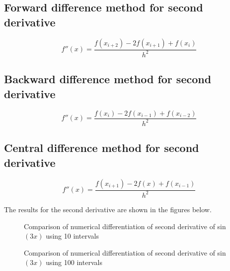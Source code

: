 \documentclass[12pt,a4paper,fleqn]{article}
\begin{document}
\subsection*{Forward difference method for second derivative}
\begin{equation}
f''(x) = \frac{f(x_{i+2})-2f(x_{i+1})+f(x_i)}{h^2}
\end{equation}

\subsection*{Backward difference method for second derivative}
\begin{equation}
f''(x) = \frac{f(x_i)-2f(x_{i-1})+f(x_{i-2})}{h^2}
\end{equation}

\subsection*{Central difference method for second derivative}
\begin{equation}
f''(x) = \frac{f(x_{i+1})-2f(x)+f(x_{i-1})}{h^2}
\end{equation}

The results for the second derivative are shown in the figures below.
\begin{figure}[p!]
\centering

\caption{Comparison of numerical differentiation of second derivative
of sin$(3x)$ using 10 intervals}
\end{figure}
\begin{figure}[p!]
\centering

\caption{Comparison of numerical differentiation of second derivative
of sin$(3x)$ using 100 intervals}
\end{figure}

\newpage
\end{document}
